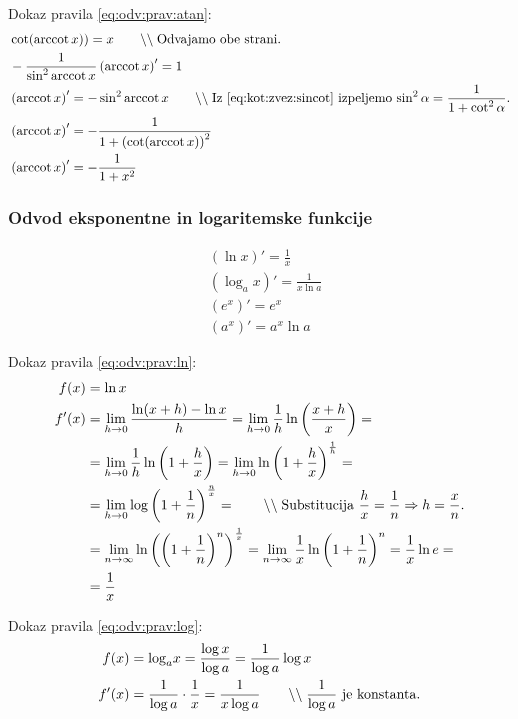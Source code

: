 \documentclass[a4paper,oneside,12pt,fleqn]{article}
\newcommand\krat\cdot
\newcommand{\comment}[1]{\ensuremath{\qquad\backslash\backslash\;}\textnormal{#1}}
\newcommand{\arccot}{\ensuremath{\operatorname{arccot}}} %
\def\limi{\displaystyle\lim_{n\to\infty}} %
\def\limh{\lim_{h\rightarrow0}} %
\renewcommand\implies\Rightarrow
\numberwithin{equation}{section}
\begin{document}
Dokaz pravila \eqref{eq:odv:prav:atan}:
\begin{align*}
  & \cot(\arccot x)) = x \comment{Odvajamo obe strani.} \\
  & -\frac{1}{\sin^2\arccot x}\left( \arccot x \right)' = 1 \\
  & \left( \arccot x \right)' = -\sin^2\arccot x \comment{Iz \eqref{eq:kot:zvez:sincot}
  izpeljemo $\sin^2\alpha = \frac{1}{1 + \cot^2\alpha}$.} \\
  & \left( \arccot x \right)' = -\frac{1}{1 + \left( \cot(\arccot x) \right)^2} \\
  &  \left( \arccot x \right)' = -\frac{1}{1 + x^2}
\end{align*}

\subsubsection{Odvod eksponentne in logaritemske funkcije}
\label{sec:odvod:prav:exp}

\begin{align}
  & \left( \ln x \right)' = \frac{1}{x} \label{eq:odv:prav:ln} \\
  & \left( \log_a\!x \right)' = \frac{1}{x\ln a} \label{eq:odv:prav:log} \\
  & \left( e^x \right)' = e^x \label{eq:odv:prav:ex} \\
  & \left( a^x \right)' = a^x\ln a \label{eq:odv:prav:ax}
\end{align}

Dokaz pravila \eqref{eq:odv:prav:ln}:
\begin{align*}
  f(x) &= \ln x \\
  f'(x) &= \limh\frac{\ln(x+h) - \ln x}{h} = \limh\frac{1}{h}\ln\left(\frac{x+h}{x}\right) = \\
  &= \limh\frac{1}{h}\ln\left( 1+\frac{h}{x} \right) = \limh\ln\left(
  1+\frac{h}{x}\right)^{\frac{1}{h}} = \\ &= \limh\log\left( 1+\frac{1}{n}
  \right)^{\frac{n}{x}} = \comment{Substitucija $\frac{h}{x} = \frac{1}{n} \implies h =
  \frac{x}{n}$.} \\
  &= \limi\ln\left(\left( 1+\frac{1}{n} \right)^n\right)^{\frac{1}{x}} =
  \limi\frac{1}{x}\ln\left( 1+\frac{1}{n} \right)^n = \frac{1}{x}\ln e = \\
  &= \frac{1}{x}
\end{align*}

Dokaz pravila \eqref{eq:odv:prav:log}:
\begin{align*}
  f(x) &= \log_a\!x = \frac{\log x}{\log a} = \frac{1}{\log a}\log x \\
  f'(x) &= \frac{1}{\log a} \krat \frac{1}{x} = \frac{1}{x\log a} \comment{$\frac{1}{\log
  a}$ je konstanta.}
\end{align*}
\end{document}
